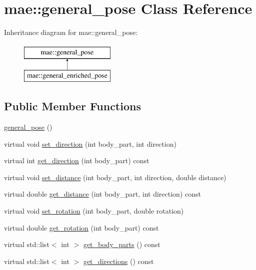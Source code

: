 \hypertarget{classmae_1_1general__pose}{\section{mae\-:\-:general\-\_\-pose Class Reference}
\label{classmae_1_1general__pose}
}
Inheritance diagram for mae\-:\-:general\-\_\-pose\-:\begin{figure}[H]
\begin{center}
\leavevmode
\includegraphics[height=2.000000cm]{classmae_1_1general__pose}
\end{center}
\end{figure}
\subsection*{Public Member Functions}
\begin{DoxyCompactItemize}
\item 
\hyperlink{classmae_1_1general__pose_a62934816ae69c70ff428a9e387944fa3}{general\-\_\-pose} ()
\item 
virtual void \hyperlink{classmae_1_1general__pose_a8dccd4cce6e26b43945230ea3fef9b4e}{set\-\_\-direction} (int body\-\_\-part, int direction)
\item 
virtual int \hyperlink{classmae_1_1general__pose_abdd09dcb3a8fd89c814eab2434ac0420}{get\-\_\-direction} (int body\-\_\-part) const 
\item 
virtual void \hyperlink{classmae_1_1general__pose_a3167544d3cf9dbd740e001c4257d917b}{set\-\_\-distance} (int body\-\_\-part, int direction, double distance)
\item 
virtual double \hyperlink{classmae_1_1general__pose_ae057a89df3dac87b46416ac757c5a370}{get\-\_\-distance} (int body\-\_\-part, int direction) const 
\item 
virtual void \hyperlink{classmae_1_1general__pose_aa747f42741ed76afca30a4cd5afb7ad1}{set\-\_\-rotation} (int body\-\_\-part, double rotation)
\item 
virtual double \hyperlink{classmae_1_1general__pose_a28c802e3b1c6932bbe31836684ba0d14}{get\-\_\-rotation} (int body\-\_\-part) const 
\item 
virtual std\-::list$<$ int $>$ \hyperlink{classmae_1_1general__pose_a75701cd408c10156a55878d05bdd4316}{get\-\_\-body\-\_\-parts} () const 
\item 
virtual std\-::list$<$ int $>$ \hyperlink{classmae_1_1general__pose_ab1b7e20ab2498a07858294de4e3eba8b}{get\-\_\-directions} () const 
\end{DoxyCompactItemize}


